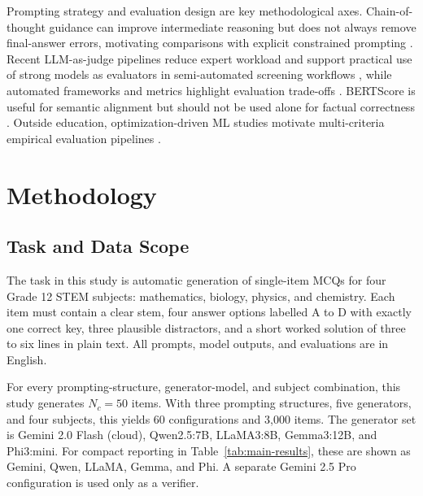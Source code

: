 ﻿\documentclass[a4paper,conference,10pt]{IEEEtran}
\begin{document}
Prompting strategy and evaluation design are key methodological axes. Chain-of-thought guidance can improve intermediate reasoning but does not always remove final-answer errors, motivating comparisons with explicit constrained prompting \cite{chan2025,chu2024cotSurvey,munaye2025}. Recent LLM-as-judge pipelines reduce expert workload and support practical use of strong models as evaluators in semi-automated screening workflows \cite{mucciaccia2025}, while automated frameworks and metrics highlight evaluation trade-offs \cite{acmEval3,wmt21metrics,acl2024Eval,evalNLP2023}. BERTScore is useful for semantic alignment but should not be used alone for factual correctness \cite{hanna2021finegrained}. Outside education, optimization-driven ML studies motivate multi-criteria empirical evaluation pipelines \cite{sarno2020electronic,aulia2023optimization,firmanto2018prediction,khotimah2019sentiment}.


\section{Methodology}

\subsection{Task and Data Scope}

The task in this study is automatic generation of single-item MCQs for four Grade 12 STEM subjects: mathematics, biology, physics, and chemistry. Each item must contain a clear stem, four answer options labelled A to D with exactly one correct key, three plausible distractors, and a short worked solution of three to six lines in plain text. All prompts, model outputs, and evaluations are in English.

For every prompting-structure, generator-model, and subject combination, this study generates \(N_c = 50\) items. With three prompting structures, five generators, and four subjects, this yields 60 configurations and 3{,}000 items. The generator set is Gemini 2.0 Flash (cloud), Qwen2.5:7B, LLaMA3:8B, Gemma3:12B, and Phi3:mini. For compact reporting in Table~\ref{tab:main-results}, these are shown as Gemini, Qwen, LLaMA, Gemma, and Phi. A separate Gemini 2.5 Pro configuration is used only as a verifier.
\end{document}
